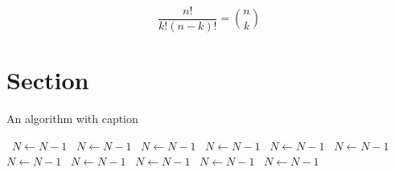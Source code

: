 \documentclass[a4paper]{article}
\begin{document}
\[ \frac{n!}{k!(n-k)!} = \binom{n}{k} \]

\section{Section}

\begin{algorithm}
\caption{An algorithm with caption}
\begin{algorithmic}
\    \State $N \gets N - 1$
\    \State $N \gets N - 1$
\    \State $N \gets N - 1$
\    \State $N \gets N - 1$
\    \State $N \gets N - 1$
\    \State $N \gets N - 1$
\    \State $N \gets N - 1$
\    \State $N \gets N - 1$
\    \State $N \gets N - 1$
\    \State $N \gets N - 1$
\    \State $N \gets N - 1$
\EndWhile
\end{algorithmic}
\end{algorithm}
\end{document}
